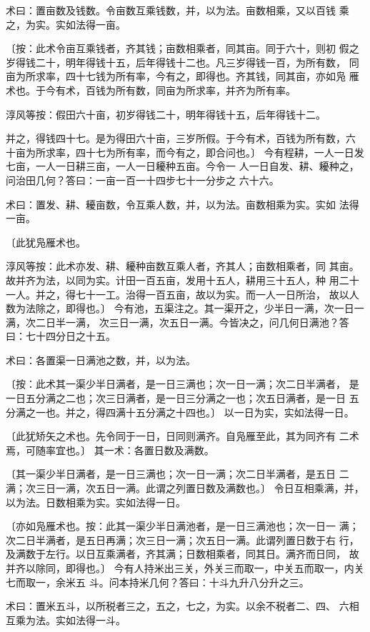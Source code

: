 \documentclass[a4paper,12pt,UTF8,twoside]{ctexbook}
\begin{document}
术曰：置亩数及钱数。令亩数互乘钱数，并，以为法。亩数相乘，又以百钱 乘之，为实。实如法得一亩。

〔按：此术令亩互乘钱者，齐其钱；亩数相乘者，同其亩。同于六十，则初 假之岁得钱二十，明年得钱十五，后年得钱十二也。凡三岁得钱一百，为所有数， 同亩为所求率，四十七钱为所有率，今有之，即得也。齐其钱，同其亩，亦如凫 雁术也。于今有术，百钱为所有数，同亩为所求率，并齐为所有率。

淳风等按：假田六十亩，初岁得钱二十，明年得钱十五，后年得钱十二。

并之，得钱四十七。是为得田六十亩，三岁所假。于今有术，百钱为所有数，六 十亩为所求率，四十七为所有率，而今有之，即合问也。〕 今有程耕，一人一日发七亩，一人一日耕三亩，一人一日耰种五亩。今令一 人一日自发、耕、耰种之，问治田几何？答曰：一亩一百一十四步七十一分步之 六十六。

术曰：置发、耕、耰亩数，令互乘人数，并，以为法。亩数相乘为实。实如 法得一亩。

〔此犹凫雁术也。

淳风等按：此术亦发、耕、耰种亩数互乘人者，齐其人；亩数相乘者，同 其亩。故并齐为法，以同为实。计田一百五亩，发用十五人，耕用三十五人，种 用二十一人。并之，得七十一工。治得一百五亩，故以为实。而一人一日所治， 故以人数为法除之，即得也。〕 今有池，五渠注之。其一渠开之，少半日一满，次一日一满，次二日半一满， 次三日一满，次五日一满。今皆决之，问几何日满池？答曰：七十四分日之十五。

术曰：各置渠一日满池之数，并，以为法。

〔按：此术其一渠少半日满者，是一日三满也；次一日一满；次二日半满者， 是一日五分满之二也；次三日满者，是一日三分满之一也；次五日满者，是一日 五分满之一也。并之，得四满十五分满之十四也。〕 以一日为实，实如法得一日。

〔此犹矫矢之术也。先令同于一日，日同则满齐。自凫雁至此，其为同齐有 二术焉，可随率宜也。〕 其一术：各置日数及满数。

〔其一渠少半日满者，是一日三满也；次一日一满；次二日半满者，是五日 二满；次三日一满，次五日一满。此谓之列置日数及满数也。〕 令日互相乘满，并，以为法。日数相乘为实。实如法得一日。

〔亦如凫雁术也。按：此其一渠少半日满池者，是一日三满池也；次一日一 满；次二日半满者，是五日再满；次三日一满；次五日一满。此谓列置日数于右 行，及满数于左行。以日互乘满者，齐其满；日数相乘者，同其日。满齐而日同， 故并齐以除同，即得也。〕 今有人持米出三关，外关三而取一，中关五而取一，内关七而取一，余米五 斗。问本持米几何？答曰：十斗九升八分升之三。

术曰：置米五斗，以所税者三之，五之，七之，为实。以余不税者二、四、 六相互乘为法。实如法得一斗。
\end{document}
